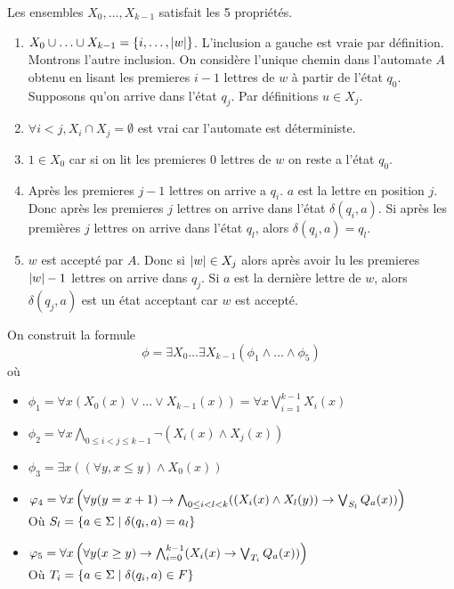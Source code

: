 \begin{proofI}
\begin{itemize}
		      Les ensembles $X_0, \ldots, X_{k-1}$ satisfait les 5 propriétés.
		      \begin{enumerate}
			      \item $X_0 \cup \ldots \cup X_{k-1} = \left\{i,\ldots,\left|w\right|\right\}$. L'inclusion a gauche est vraie par définition. Montrons l'autre inclusion.
			            On considère l'unique chemin dans l'automate $A$ obtenu en lisant les premieres $i-1$ lettres de $w$ à partir de l'état $q_0$.
			            Supposons qu'on arrive dans l'état $q_j$. Par définitions $u \in X_j$.
			      \item $\forall i < j, X_i \cap X_j = \emptyset$ est vrai car l'automate est déterministe.
			      \item $1 \in X_0$ car si on lit les premieres $0$ lettres de $w$ on reste a l'état $q_0$.
			      \item Après les premieres $j-1$ lettres on arrive a $q_i$. $a$ est la lettre en position $j$. Donc après les
			            premieres $j$ lettres on arrive dans l'état $\delta (q_i, a)$. Si après les premières $j$ lettres on arrive dans l'état $q_l$, alors
			            $\delta (q_i, a) = q_l$.
			      \item $w$ est accepté par $A$. Donc si $\left|w\right| \in X_j$ alors après avoir lu les premieres $\left|w\right| - 1$ lettres on arrive dans $q_j$.
			            Si $a$ est la dernière lettre de $w$, alors $\delta (q_j,a)$ est un état acceptant car $w$ est accepté.
		      \end{enumerate}
		      On construit la formule
		      $$ \phi = \exists X_0 \ldots \exists X_{k-1} (\phi_1 \land \ldots \land \phi_5)$$
		      où
		      \begin{itemize}
			      \item $\phi_1 = \forall x (X_0(x) \lor \ldots \lor X_{k-1}(x)) = \forall x \bigvee_{i=1}^{k-1} X_i(x)$
			      \item $\phi_2 = \forall x \bigwedge_{0\leq i < j \leq k-1}\lnot (X_i(x) \land X_j(x))$
			      \item $\phi_3 = \exists x \left((\forall y, x \leq y) \land X_0(x) \right)$
			      \item $\varphi_4 = \forall x \left( \forall y (y = x + 1)  \rightarrow \bigwedge_{0\leq i < l < k} ( (X_i (x) \land X_l(y) )\rightarrow \bigvee_{S_l} Q_a(x))\right)$\\
			            Où $S_l = \left\{a \in \Sigma \mid \delta (q_i,a) = a_l\right\}$
			      \item $\varphi_5 = \forall x \left( \forall y (x \geq y)  \rightarrow \bigwedge_{i = 0}^{k-1} ( X_i(x) \rightarrow \bigvee_{T_i} Q_a(x))\right)$\\
			            Où $T_i = \left\{a \in \Sigma \mid \delta (q_i,a) \in F\right\}$


\end{itemize}
\end{itemize}
\end{proofI}
